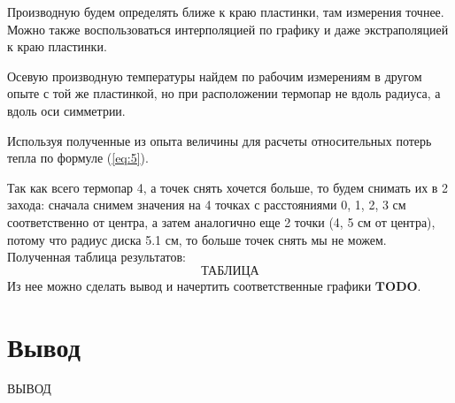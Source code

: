 \documentclass[a4paper,11.5pt]{article} %
\begin{document}
Производную будем определять ближе к краю пластинки, там измерения точнее. Можно также воспользоваться интерполяцией по графику и даже экстраполяцией к краю пластинки. 

Осевую производную температуры найдем по рабочим измерениям в другом опыте с той же пластинкой, но при расположении термопар не вдоль радиуса, а вдоль оси симметрии.

Используя полученные из опыта величины для расчеты относительных потерь тепла по формуле (\ref{eq:5}).

Так как всего термопар 4, а точек снять хочется больше, то будем снимать их в 2 захода: сначала снимем значения на 4 точках с расстояниями 0, 1, 2, 3 см соответственно от центра, а затем аналогично еще 2 точки (4, 5 см от центра), потому что радиус диска 5.1 см, то больше точек снять мы не можем. Полученная таблица результатов:
\[\textbf{ТАБЛИЦА}\]
Из нее можно сделать вывод и начертить соответственные графики $\textbf{TODO}$.


\section{Вывод}
ВЫВОД

\begin{figure}[h]
\end{figure}


					
\end{document}
